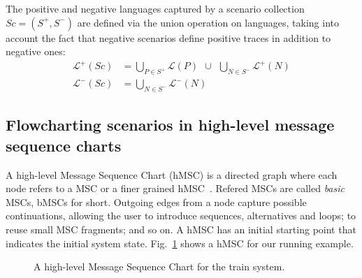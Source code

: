 The positive and negative languages captured by a scenario collection $Sc = (S^+,S^-)$ are defined via the union operation on languages, taking into account the fact that negative scenarios define positive traces in addition to negative ones:
\begin{align}
\mathcal{L}^+(Sc) &= \bigcup_{P \in S^+} \mathcal{L}(P)~~\cup~~\bigcup_{N \in S^{-}} \mathcal{L}^{+}(N) \\
\mathcal{L}^-(Sc) &= \bigcup_{N \in S^-} \mathcal{L}^{-}(N)
\end{align}

\subsection{Flowcharting scenarios in high-level message sequence charts\label{subsection:background-hmsc}}

A high-level Message Sequence Chart (hMSC) is a directed graph where each node refers to a MSC or a finer grained hMSC~\cite{ITU:1996}. Refered MSCs are called \emph{basic} MSCs, bMSCs for short. Outgoing edges from a node capture possible continuations, allowing the user to introduce sequences, alternatives and loops; to reuse small MSC fragments; and so on. A hMSC has an initial starting point that indicates the initial system state. Fig.~\ref{image:train-hmsc} shows a hMSC for our running example.

\vspace{0.4cm}
\begin{figure}[H]\centering
{}
\caption{A high-level Message Sequence Chart for the train system.\label{image:train-hmsc}}
\end{figure}

